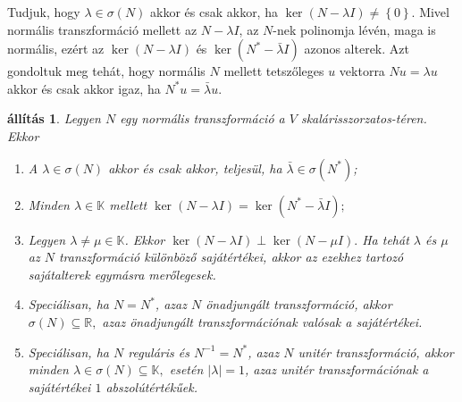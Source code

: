 \documentclass[a4paper, showtrims]{memoir}
\theoremstyle{plain}
\newtheorem{proposition}{állítás}[chapter]
\theoremstyle{remark}
\theoremstyle{definition}
\begin{document}
Tudjuk, hogy $\lambda\in\sigma(N)$ akkor és csak akkor, ha $\ker(N-\lambda I)\neq \left\{ 0 \right\}$.
Mivel normális transzformáció mellett az $N-\lambda I$,
az $N$-nek polinomja lévén,
maga is normális,
ezért az $\ker (N-\lambda I)$ és $\ker (N^\ast-\bar{\lambda}I)$ azonos alterek.
Azt gondoltuk meg tehát, hogy normális $N$ mellett
tetszőleges $u$ vektorra $Nu=\lambda u$ akkor és csak akkor igaz, ha $N^\ast u=\bar{\lambda}u$.
\begin{proposition}\label{pr:normtul}
	Legyen $N$ egy normális transzformáció a $V$ skalárisszorzatos-téren.
	Ekkor
	\begin{enumerate}
		\item
		      A $\lambda\in\sigma\left( N \right)$ akkor és csak akkor,
		      teljesül, ha
		      $\bar{\lambda}\in\sigma\left( N^\ast \right)$;
		\item
		      Minden $\lambda\in\mathbb{K}$ mellett
		      \begin{math}
			      \ker (N-\lambda I)=\ker (N^\ast-\bar{\lambda}I);
		      \end{math}
		\item
              Legyen $\lambda\neq \mu\in\mathbb{K}$. Ekkor 
		      \begin{math}
			      \ker \left( N-\lambda I \right)\perp\ker\left( N-\mu I \right).
		      \end{math}
              Ha tehát $\lambda$ és $\mu$ az $N$ transzformáció különböző sajátértékei, 
              akkor az ezekhez tartozó sajátalterek egymásra merőlegesek.
		\item Speciálisan, ha $N=N^\ast$, azaz $N$ önadjungált transzformáció, akkor
		      \begin{math}
			      \sigma\left( N \right)\subseteq \mathbb{R},
		      \end{math}
		      azaz önadjungált transzformációnak valósak a sajátértékei.
        \item Speciálisan, ha $N$ reguláris és $N^{-1}=N^\ast$, azaz $N$ unitér transzformáció, akkor
              minden 
		      \begin{math}
			      \lambda\in\sigma\left( N \right)\subseteq \mathbb{K},
		      \end{math}
              esetén $|\lambda|=1$, 
		      azaz unitér transzformációnak a sajátértékei $1$ abszolútértékűek.
		      \qedhere
	\end{enumerate}
\end{proposition}
\end{document}
